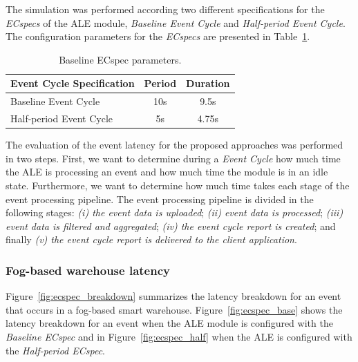 The simulation was performed according two different specifications for the \textit{ECspecs} of the
\gls{ALE} module, \textit{Baseline Event Cycle} and \textit{Half-period Event Cycle}. The configuration
parameters for the \textit{ECspecs} are presented in Table~\ref{table:ecspec_parameters}.

\begin{table}[ht!]
 \begin{tabular}{|l|c|c|}
  \hline
  Event Cycle Specification & Period  & Duration \\ \hline
  Baseline Event Cycle      &  10s    & 9.5s     \\ \hline
  Half-period Event Cycle   &   5s    & 4.75s    \\ \hline
 \end{tabular}
 \caption{Baseline ECspec parameters.}
 \label{table:ecspec_parameters}
\end{table}

The evaluation of the event latency for the proposed approaches was performed in two steps. First,
we want to determine during a \textit{Event Cycle} how much time the \gls{ALE} is processing an event
and how much time the module is in an idle state. Furthermore, we want to determine how much time
takes each stage of the event processing pipeline. The event processing pipeline is divided in the
following stages: \textit{(i) the event data is uploaded}; \textit{(ii) event data is processed};
\textit{(iii) event data is filtered and aggregated}; \textit{(iv) the event cycle report is created};
and finally \textit{(v) the event cycle report is delivered to the client application}.

\subsubsection{Fog-based warehouse latency}
\label{subs:eval_exp_latency_ecspec}
Figure~\ref{fig:ecspec_breakdown} summarizes the latency breakdown for an event that occurs in a fog-based
smart warehouse. Figure~\ref{fig:ecspec_base} shows the latency breakdown for an event when the
\gls{ALE} module is configured with the \textit{Baseline ECspec} and in Figure~\ref{fig:ecspec_half}
when the \gls{ALE} is configured with the \textit{Half-period ECspec}.\\

